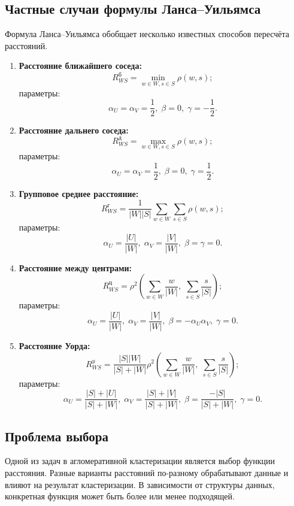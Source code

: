 \subsection{Частные случаи формулы Ланса–Уильямса}
Формула Ланса–Уильямса обобщает несколько известных способов пересчёта расстояний.

\begin{enumerate}
    \item \textbf{Расстояние ближайшего соседа:}
    \[
    R^{б}_{WS} = \min_{w \in W, s \in S} \rho(w, s);
    \]
    параметры:
    \[
    \alpha_U = \alpha_V = \frac{1}{2}, \; \beta = 0, \; \gamma = -\frac{1}{2}.
    \]

    \item \textbf{Расстояние дальнего соседа:}
    \[
    R^{д}_{WS} = \max_{w \in W, s \in S} \rho(w, s);
    \]
    параметры:
    \[
    \alpha_U = \alpha_V = \frac{1}{2}, \; \beta = 0, \; \gamma = \frac{1}{2}.
    \]

    \item \textbf{Групповое среднее расстояние:}
    \[
    R^{г}_{WS} = \frac{1}{|W||S|} \sum_{w \in W} \sum_{s \in S} \rho(w, s);
    \]
    параметры:
    \[
    \alpha_U = \frac{|U|}{|W|}, \; \alpha_V = \frac{|V|}{|W|}, \; \beta = \gamma = 0.
    \]

    \item \textbf{Расстояние между центрами:}
    \[
    R^{ц}_{WS} = \rho^2 \left( \sum_{w \in W} \frac{w}{|W|}, \; \sum_{s \in S} \frac{s}{|S|} \right);
    \]
    параметры:
    \[
    \alpha_U = \frac{|U|}{|W|}, \; \alpha_V = \frac{|V|}{|W|}, \; \beta = -\alpha_U \alpha_V, \; \gamma = 0.
    \]

    \item \textbf{Расстояние Уорда:}
    \[
    R^{y}_{WS} = \frac{|S||W|}{|S| + |W|} \rho^2 \left( \sum_{w \in W} \frac{w}{|W|}, \; \sum_{s \in S} \frac{s}{|S|} \right);
    \]
    параметры:
    \[
    \alpha_U = \frac{|S| + |U|}{|S| + |W|}, \; \alpha_V = \frac{|S| + |V|}{|S| + |W|}, \; \beta = \frac{-|S|}{|S| + |W|}, \; \gamma = 0.
    \]
\end{enumerate}

\subsection{Проблема выбора}
Одной из задач в агломеративной кластеризации является выбор функции расстояния. Разные варианты расстояний по-разному обрабатывают данные и влияют на результат кластеризации. В зависимости от структуры данных, конкретная функция может быть более или менее подходящей.

